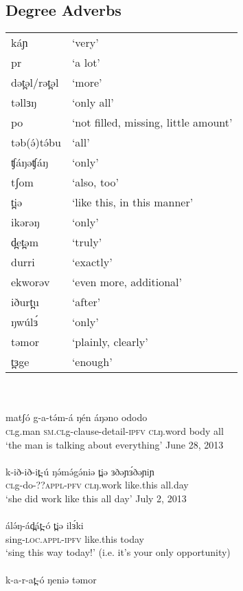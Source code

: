 \subsection{Degree Adverbs}
\begin{tabular}[t]{ll}
káɲ			&	‘very’\\
pr			&	‘a lot’\\
dət̪əl/rət̪əl	&	‘more’\\
təllɜŋ		&	‘only all’\\
po			&	‘not filled, missing, little amount’\\
təb(ə́)tə́bu	&	‘all'\\
ʧáŋəʧáŋ		&	‘only’\\
tʃom		&	‘also, too’\\
t̪iə			&	‘like this, in this manner’\\
ikərəŋ		&	‘only’\\
d̪et̪əm		&	‘truly’\\
durri		&	‘exactly’\\
ekworəv		&	‘even more, additional’\\
iðurt̪u		&	‘after’\\
ŋwúlɜ́		&	‘only’\\
təmor		&	‘plainly, clearly’\\
t̪ɜge		&	‘enough’\\
\end{tabular}
\\
\\
\gll matʃó	g-a-tə́m-á 	ŋén	áŋəno	ododo	\\
\textsc{cl}g.man	\textsc{sm.cl}g-clause-detail-\textsc{ipfv}  \textsc{cl}ŋ.word	body 	all\\
\trans ‘the man is talking about everything’		\hfill	June 28, 2013\\
\\
\gll k-ið-ið-it̪-ú 	ŋə́mə́gə́niə 	t̪iə 	ɜðəɲɜ́ðəɲiɲ\\
\textsc{cl}g-do-??\textsc{appl-pfv}  	\textsc{cl}ŋ.work 	like.this 	all.day  	\\
\trans ‘she did work like this all day’			\hfill		July 2, 2013\\
\\
\gll álə́ŋ-ád̪át̪-ó 	t̪iə 	ilɜ́ki\\
sing-\textsc{loc.appl-ipfv}	like.this 	today	\\
\trans ‘sing this way today!’ (i.e. it’s your only opportunity)\\
\\
\gll k-a-r-at̪-ó 	ŋeniə	təmor\\
